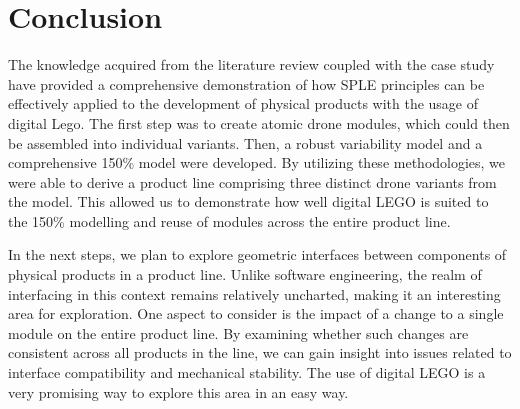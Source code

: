 \documentclass[sigconf,review]{acmart}
\begin{document}
\section{Conclusion}
\label{sec:conclusion}

The knowledge acquired from the literature review coupled with the case study have provided a comprehensive demonstration of how SPLE principles can be effectively applied to the development of physical products with the usage of digital Lego. 
The first step was to create atomic drone modules, which could then be assembled into individual variants. 
Then, a robust variability model and a comprehensive 150\% model were developed. 
By utilizing these methodologies, we were able to derive a product line comprising three distinct drone variants from the model. 
This allowed us to demonstrate how well digital LEGO is suited to the 150\% modelling and reuse of modules across the entire product line.

In the next steps, we plan to explore geometric interfaces between components of physical products in a product line. Unlike software engineering, the realm of interfacing in this context remains relatively uncharted, making it an interesting area for exploration. 
One aspect to consider is the impact of a change to a single module on the entire product line. 
By examining whether such changes are consistent across all products in the line, we can gain insight into issues related to interface compatibility and mechanical stability. 
The use of digital LEGO is a very promising way to explore this area in an easy way.



\end{document}

